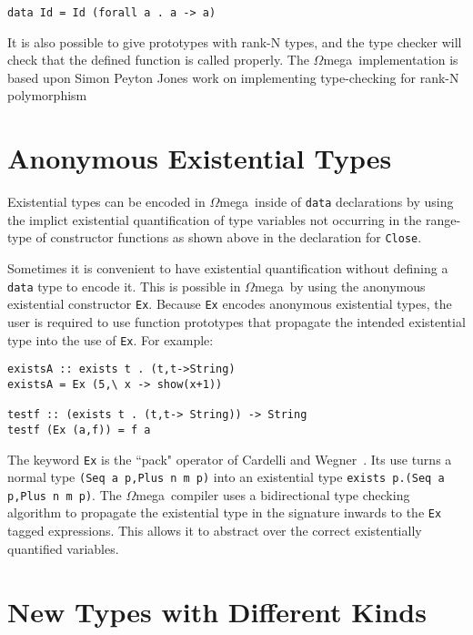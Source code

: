 \documentclass[11pt,twoside]{article}
\newcommand{\om}{$\Omega$mega}
\begin{document}
\begin{verbatim}
data Id = Id (forall a . a -> a)
\end{verbatim}
It is also possible to give prototypes with rank-N types, and the type checker
will check that the defined function is called properly. The \om\ implementation
is based upon Simon Peyton Jones work on implementing type-checking for
rank-N polymorphism~\cite{RankN}

\section{Anonymous Existential Types}\label{exists}
Existential types can be encoded in \om\ inside of {\tt data}
declarations by using the implict existential quantification
of type variables not occurring in the range-type of constructor
functions as shown above in the declaration for {\tt Close}.

Sometimes it is convenient to have existential quantification
without defining a {\tt data} type to encode it. This is possible
in \om\ by using the anonymous existential constructor {\tt Ex}.
Because {\tt Ex} encodes anonymous existential types, the user is
required to use function prototypes that propagate the
intended existential type into the use of {\tt Ex}. For example:
\begin{verbatim}
existsA :: exists t . (t,t->String)
existsA = Ex (5,\ x -> show(x+1))

testf :: (exists t . (t,t-> String)) -> String
testf (Ex (a,f)) = f a
\end{verbatim}

\noindent The keyword {\tt Ex} is the ``pack" operator of Cardelli and
Wegner~\cite{Cardelli-Wegner85}. Its use turns a normal type
{\small \verb+(Seq a p,Plus n m p)+} into an existential type
{\small \verb+exists p.(Seq a p,Plus n m p)+}. The \om\ compiler
uses a bidirectional type checking algorithm to propagate
the existential type in the signature inwards to the
{\tt Ex} tagged expressions. This allows it to
abstract over the correct existentially quantified variables.




\section{New Types with Different Kinds} \label{kinds}
\end{document}

